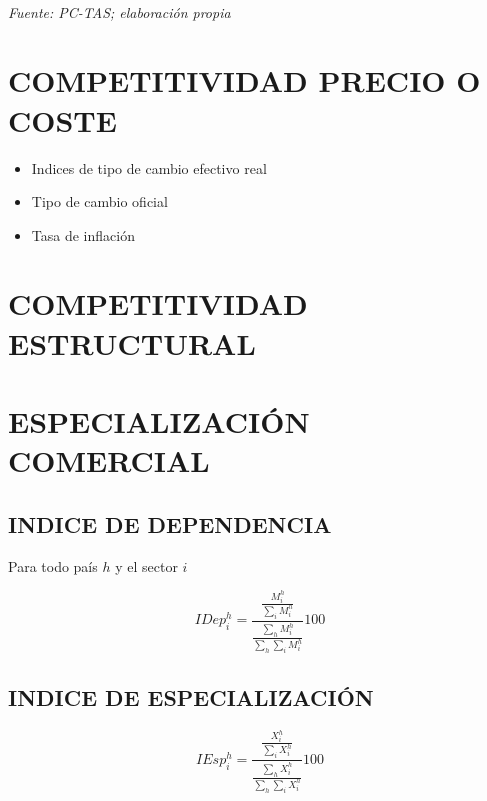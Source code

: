 \documentclass[11pt]{article}
\providecommand{\tightlist}{%
      \setlength{\itemsep}{0pt}\setlength{\parskip}{0pt}}
\begin{document}
    \begin{center}
    \end{center}
    { \hspace*{\fill} \\}
    
    \emph{Fuente: PC-TAS; elaboración propia}

    \section{COMPETITIVIDAD PRECIO O
COSTE}\label{competitividad-precio-o-coste}

\begin{itemize}
\tightlist
\item
  Indices de tipo de cambio efectivo real
\item
  Tipo de cambio oficial
\item
  Tasa de inflación
\end{itemize}

    \section{COMPETITIVIDAD ESTRUCTURAL}\label{competitividad-estructural}

    \section{ESPECIALIZACIÓN COMERCIAL}\label{especializaciuxf3n-comercial}

\subsection{INDICE DE DEPENDENCIA}\label{indice-de-dependencia}

Para todo país \(h\) y el sector \(i\)

\begin{equation}
IDep^h_i = \frac{\frac{M^h_i}{\sum_i M^h_i}}{\frac{\sum_h M^h_i}{\sum_h \sum_i M^h_i}} 100
\end{equation}

\subsection{INDICE DE
ESPECIALIZACIÓN}\label{indice-de-especializaciuxf3n}

\begin{equation}
IEsp^h_i = \frac{\frac{X^h_i}{\sum_i X^h_i}}{\frac{\sum_h X^h_i}{\sum_h \sum_i X^h_i}} 100
\end{equation}
\end{document}
